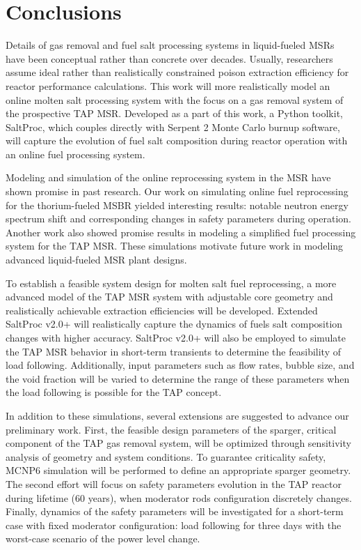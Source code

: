 \section{Conclusions}
Details of gas removal and fuel salt processing systems in liquid-fueled 
\glspl{MSR} have been conceptual rather than concrete over decades. Usually, 
researchers assume ideal rather than realistically constrained poison 
extraction efficiency for reactor performance calculations. 
This work will more realistically model an online molten salt processing 
system with the focus on a gas removal system of the prospective \gls{TAP} 
\gls{MSR}. Developed as a part of this work, a Python toolkit, SaltProc, which 
couples directly with Serpent 2 Monte Carlo burnup software, will capture the 
evolution of fuel salt composition during reactor operation with an online 
fuel processing system.

Modeling and simulation of the online reprocessing system in the \gls{MSR} 
have shown promise in past research. Our work on simulating online fuel  
reprocessing for the thorium-fueled \gls{MSBR} yielded interesting results: 
notable neutron energy spectrum shift and corresponding changes in safety 
parameters during operation. Another work also showed promise results in 
modeling a simplified fuel processing system for the \gls{TAP} \gls{MSR}. 
These simulations motivate future work in modeling advanced liquid-fueled 
\gls{MSR} plant designs.

To establish a feasible system design for molten salt fuel reprocessing, a 
more advanced model of the \gls{TAP} \gls{MSR} system with adjustable core 
geometry and realistically achievable extraction efficiencies will be 
developed. Extended SaltProc v2.0+ will realistically capture the dynamics of 
fuels salt composition changes with higher accuracy. SaltProc v2.0+ will also 
be employed to simulate the \gls{TAP} \gls{MSR} behavior in short-term 
transients to determine the feasibility of load following. Additionally, input 
parameters such as flow rates, bubble size, and the void fraction will be 
varied to determine the range of these parameters when the load following is 
possible for the \gls{TAP} concept.

In addition to these simulations, several extensions are suggested to 
advance our preliminary work. First, the feasible design parameters of the 
sparger, critical component of the \gls{TAP} gas removal system, will be 
optimized through sensitivity analysis of geometry and system conditions. To 
guarantee criticality safety, MCNP6 simulation will be performed to define an 
appropriate sparger geometry. The second effort will focus on safety  
parameters evolution in the \gls{TAP} reactor during lifetime (60 years),  
when moderator rods configuration discretely changes. Finally, dynamics of the 
safety parameters will be investigated for a short-term case with fixed 
moderator configuration: load following for three days with the worst-case 
scenario of the power level change. 

